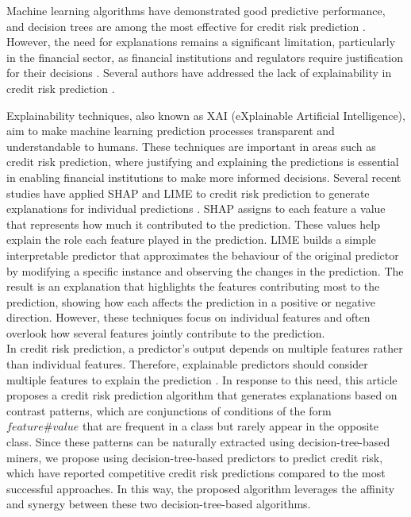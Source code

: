     Machine learning algorithms have demonstrated good predictive performance, and decision trees are among the most effective for credit risk prediction \cite{weber2024applications, chang2024prediction, aruleba2024effective, zhang2025blockchain, xia2025confidence, wu2024credit, zou2025interpretable}. However, the need for explanations remains a significant limitation, particularly in the financial sector, as financial institutions and regulators require justification for their decisions \cite{sowmiya2024credit, ravi2025explainable}. Several authors have addressed the lack of explainability in credit risk prediction \cite{lin2025credit, zandi2025attention,sun2025enhancing}. \newline
    
    Explainability techniques, also known as XAI (eXplainable Artificial Intelligence), aim to make machine learning prediction processes transparent and understandable to humans. These techniques are important in areas such as credit risk prediction, where justifying and explaining the predictions is essential in enabling financial institutions to make more informed decisions. Several recent studies have applied SHAP \cite{lundberg2017unified} and LIME \cite{ribeiro2016should} to credit risk prediction to generate explanations for individual predictions \cite{garcia2025machine, baisholan2025fraudx, alonso2025should}. SHAP assigns to each feature a value that represents how much it contributed to the prediction. These values help explain the role each feature played in the prediction. LIME builds a simple interpretable predictor that approximates the behaviour of the original predictor by modifying a specific instance and observing the changes in the prediction. The result is an explanation that highlights the features contributing most to the prediction, showing how each affects the prediction in a positive or negative direction. However, these techniques focus on individual features and often overlook how several features jointly contribute to the prediction. \\

    {\color{blue}
    In credit risk prediction, a predictor's output depends on multiple features rather than individual features. Therefore, explainable predictors should consider multiple features to explain the prediction \cite{zhang2025method, do2024explainable}. In response to this need, this article proposes a credit risk prediction algorithm that generates explanations based on contrast patterns, which are conjunctions of conditions of the form $feature \# value$ that are frequent in a class but rarely appear in the opposite class. Since these patterns can be naturally extracted using decision-tree-based miners, we propose using decision-tree-based predictors to predict credit risk, which have reported competitive credit risk predictions compared to the most successful approaches. In this way, the proposed algorithm leverages the affinity and synergy between these two decision-tree-based algorithms. \newline
    } 
    
